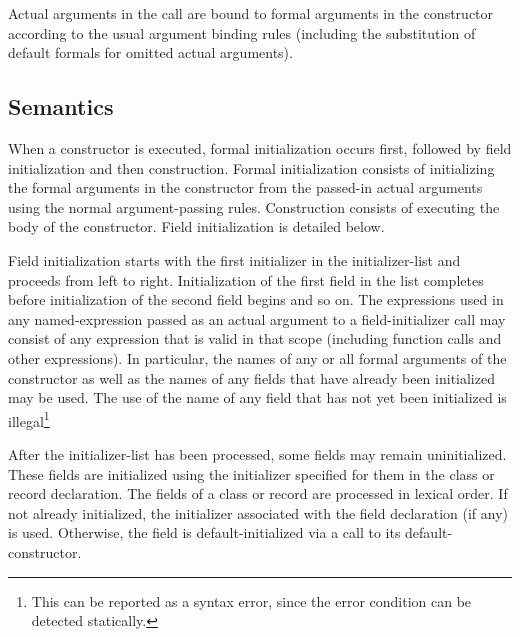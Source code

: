 Actual arguments in the call are bound to formal arguments in the constructor according to
the usual argument binding rules (including the substitution of default formals for
omitted actual arguments).

\subsection{Semantics}
\label{Constructor_Semantics}

When a constructor is executed, formal initialization occurs first, followed by field
initialization and then construction.  Formal initialization consists of initializing the
formal arguments in the constructor from the passed-in actual arguments using the normal
argument-passing rules.  Construction consists of executing the body of the
constructor.  Field initialization is detailed below.

Field initialization starts with the first initializer in the initializer-list and
proceeds from left to right.  Initialization of the first field in the list completes
before initialization of the second field begins and so on.  The expressions used in any
named-expression passed as an actual argument to a field-initializer call may consist of
any expression that is valid in that scope (including function calls and other
expressions).  In particular, the names of any or all formal arguments of the constructor
as well as the names of any fields that have already been initialized may be used.  The
use of the name of any field that has not yet been initialized is illegal\footnote{This
  can be reported as a syntax error, since the error condition can be detected
  statically.}

After the initializer-list has been processed, some fields may remain uninitialized.
These fields are initialized using the initializer specified for them in the
class or record declaration.  The fields of a class or record are processed in lexical
order.  If not already initialized, the initializer associated with the field declaration
(if any) is used.  Otherwise, the field is default-initialized via a call to its
default-constructor.

